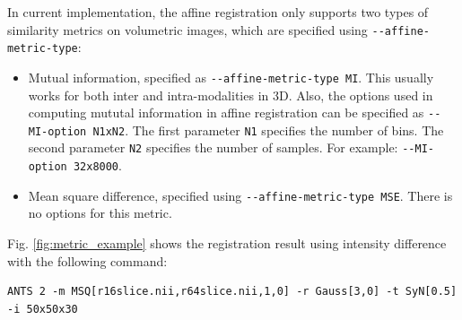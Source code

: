 In current implementation, the affine registration only supports two types of similarity metrics on volumetric images, which are specified using \verb"--affine-metric-type":
\begin{itemize}
    \item Mutual information, specified as \verb"--affine-metric-type MI". This usually works for both inter and intra-modalities in 3D. Also, the options used in computing mututal information in affine registration can be specified as \verb"--MI-option N1xN2". The first parameter \verb"N1" specifies the number of bins. The second parameter \verb"N2" specifies the number of samples. For example: \verb"--MI-option 32x8000".

    \item Mean square difference, specified using \verb"--affine-metric-type MSE". There is no options for this metric.
\end{itemize}

Fig. \ref{fig:metric_example} shows the registration result using intensity difference with the following command:
\begin{verbatim}
ANTS 2 -m MSQ[r16slice.nii,r64slice.nii,1,0] -r Gauss[3,0] -t SyN[0.5] -i 50x50x30
\end{verbatim}

